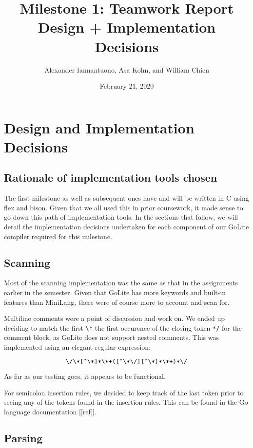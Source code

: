 \documentclass{article}
\title{
    Milestone 1: Teamwork Report\\
    \large Design + Implementation Decisions
}
\author{Alexander Iannantuono, Asa Kohn, and William Chien}
\date{February 21, 2020}
\begin{document}
\maketitle

\section{Design and Implementation Decisions}

\subsection{Rationale of implementation tools chosen}

The first milestone as well as subsequent ones have and will be written in C
using flex and bison. Given that we all used this in prior coursework, it made
sense to go down this path of implementation tools. In the sections
that follow, we will detail the implementation decisions undertaken for each
component of our GoLite compiler required for this milestone.

\subsection{Scanning}

Most of the scanning implementation was the same as that in the assignments
earlier in the semester. Given that GoLite has more keywords and built-in
features than MiniLang, there were of course more to account and scan for.

Multiline comments were a point of discussion and work on. We ended up deciding
to match the first \verb|\*| the first occurence of the closing token \verb|*/|
for the comment block, as GoLite does not support nested comments.
This was implemented using an elegant regular expression:

\[
    \verb|\/\*[^\*]*\*+([^\*\/][^\*]*\*+)*\/|
\]

As far as our testing goes, it appears to be functional.


For semicolon insertion rules, we decided to keep track of the last token prior
to seeing any of the tokens found in the insertion rules. This can be found in
the Go language documentation [[ref]].


\subsection{Parsing}
\end{document}
